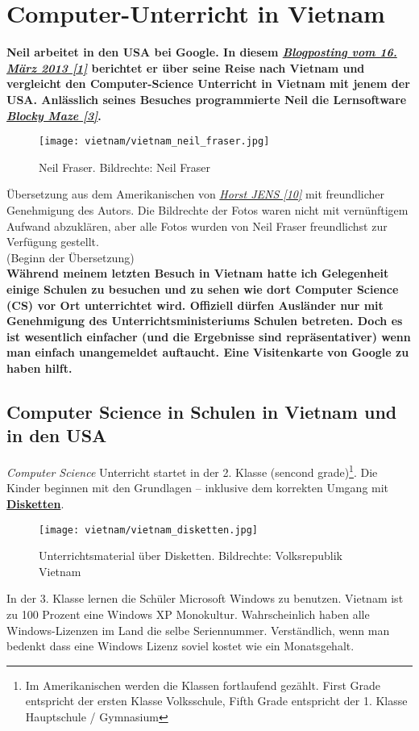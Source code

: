 \section*{Computer-Unterricht in Vietnam}
\hypertarget{vietnam}{}
\label{vietnam}

\textbf{Neil arbeitet in den USA bei Google. In diesem \href{http://neil.fraser.name/news/2013/03/16/}{\textit{Blogposting vom 16. M\"arz 2013 [1]}} berichtet er über seine Reise nach Vietnam und vergleicht den Computer-Science Unterricht in Vietnam mit jenem der USA. Anlässlich seines Besuches programmierte Neil die Lernsoftware \href{http://blockly-demo.appspot.com/static/apps/maze/en.html?level=1}{\textit{Blocky Maze [3]}}.} 

\begin{figure}
\texttt{[image: vietnam/vietnam\_neil\_fraser.jpg]} \\
\caption{Neil Fraser. Bildrechte: Neil Fraser}
\end{figure}

Übersetzung aus dem Amerikanischen von \href{http://spielend-programmieren.at}{\textit{Horst JENS [10]}}  mit freundlicher Genehmigung des Autors. Die Bildrechte der Fotos waren nicht mit vernünftigem Aufwand abzuklären, aber alle Fotos wurden von Neil Fraser freundlichst zur Verfügung gestellt. \\

(Beginn der Übersetzung) \\

\textbf{Während meinem letzten Besuch in Vietnam hatte ich Gelegenheit einige Schulen zu besuchen und zu sehen wie dort Computer Science (CS) vor Ort unterrichtet wird. Offiziell dürfen Ausländer nur mit Genehmigung des Unterrichtsministeriums Schulen betreten. Doch es ist wesentlich einfacher (und die Ergebnisse sind repräsentativer) wenn man einfach unangemeldet auftaucht. Eine Visitenkarte von Google zu haben hilft.}

\subsection*{Computer Science in Schulen in Vietnam und in den USA}


\textit{Computer Science} Unterricht startet in der 2. Klasse (sencond grade)\footnote{Im Amerikanischen werden die Klassen fortlaufend gez\"ahlt. First Grade entspricht der ersten Klasse Volksschule, Fifth Grade entspricht der 1. Klasse Hauptschule / Gymnasium}. Die Kinder beginnen mit den Grundlagen -- inklusive dem korrekten Umgang mit \href{http://de.wikipedia.org/wiki/Diskette}{\textbf{Disketten}}.
\begin{figure}
\texttt{[image: vietnam/vietnam\_disketten.jpg]}
\caption{Unterrichtsmaterial über Disketten. Bildrechte: Volksrepublik Vietnam}
\end{figure}
In der 3. Klasse lernen die Schüler Microsoft Windows zu benutzen. Vietnam ist zu 100 Prozent eine Windows XP Monokultur. Wahrscheinlich haben alle Windows-Lizenzen im Land die selbe Seriennummer. Verständlich, wenn man bedenkt dass eine Windows Lizenz soviel kostet wie ein Monatsgehalt.

